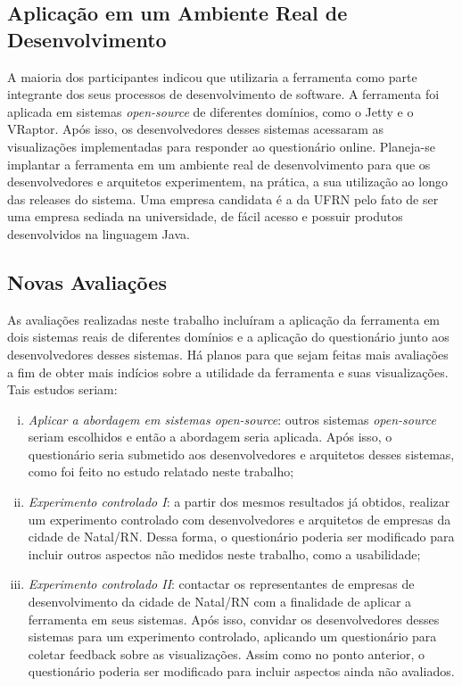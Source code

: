 \subsection{Aplicação em um Ambiente Real de Desenvolvimento}

A maioria dos participantes indicou que utilizaria a ferramenta como parte integrante dos seus processos de desenvolvimento de software. A ferramenta foi aplicada em sistemas \textit{open-source} de diferentes domínios, como o Jetty e o VRaptor. Após isso, os desenvolvedores desses sistemas acessaram as visualizações implementadas para responder ao questionário online. Planeja-se implantar a ferramenta em um ambiente real de desenvolvimento para que os desenvolvedores e arquitetos experimentem, na prática, a sua utilização ao longo das releases do sistema. Uma empresa candidata é a da UFRN pelo fato de ser uma empresa sediada na universidade, de fácil acesso e possuir produtos desenvolvidos na linguagem Java.

\subsection{Novas Avaliações}

As avaliações realizadas neste trabalho incluíram a aplicação da ferramenta em dois sistemas reais de diferentes domínios e a aplicação do questionário junto aos desenvolvedores desses sistemas. Há planos para que sejam feitas mais avaliações a fim de obter mais indícios sobre a utilidade da ferramenta e suas visualizações. Tais estudos seriam:
\begin{enumerate}[(i)]
	\item \textit{Aplicar a abordagem em sistemas open-source}: outros sistemas \textit{open-source} seriam escolhidos e então a abordagem seria aplicada. Após isso, o questionário seria submetido aos desenvolvedores e arquitetos desses sistemas, como foi feito no estudo relatado neste trabalho;
	\item \textit{Experimento controlado I}: a partir dos mesmos resultados já obtidos, realizar um experimento controlado com desenvolvedores e arquitetos de empresas da cidade de Natal/RN. Dessa forma, o questionário poderia ser modificado para incluir outros aspectos não medidos neste trabalho, como a usabilidade;
	\item \textit{Experimento controlado II}: contactar os representantes de empresas de desenvolvimento da cidade de Natal/RN com a finalidade de aplicar a ferramenta em seus sistemas. Após isso, convidar os desenvolvedores desses sistemas para um experimento controlado, aplicando um questionário para coletar feedback sobre as visualizações. Assim como no ponto anterior, o questionário poderia ser modificado para incluir aspectos ainda não avaliados.
\end{enumerate}

